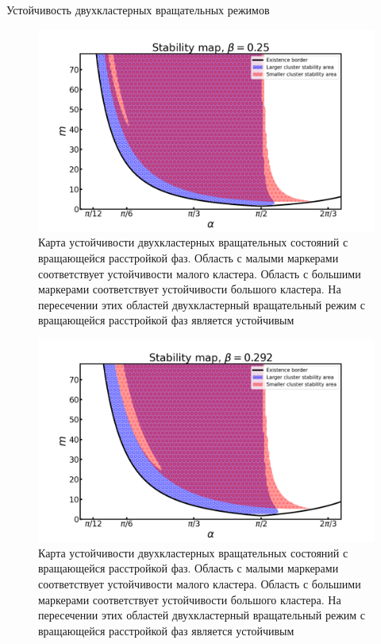 \begin{chapter}{Устойчивость двухкластерных вращательных режимов}
	
	\begin{figure}[h!]\center
		\includegraphics[width=1\columnwidth]{pictures/Figure_25.png}
		\caption{Карта устойчивости двухкластерных вращательных состояний с вращающейся расстройкой фаз.
		Область с малыми маркерами соответствует устойчивости малого кластера.
		Область с большими маркерами соответствует устойчивости большого кластера.
		На пересечении этих областей двухкластерный вращательный режим с вращающейся расстройкой фаз является устойчивым}
		\label{map-025}
	\end{figure}


	\begin{figure}[h!]\center
		\includegraphics[width=1\columnwidth]{pictures/Figure_292.png}
		\caption{Карта устойчивости двухкластерных вращательных состояний с вращающейся расстройкой фаз.
		Область с малыми маркерами соответствует устойчивости малого кластера.
		Область с большими маркерами соответствует устойчивости большого кластера.
		На пересечении этих областей двухкластерный вращательный режим с вращающейся расстройкой фаз является устойчивым}
		\label{map-0-292}
	\end{figure}


\end{chapter}
